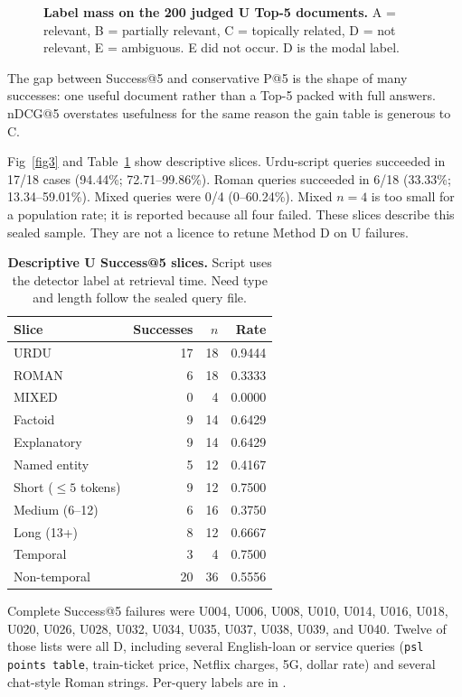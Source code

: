 \documentclass[10pt,letterpaper]{article}
\begin{document}
\begin{figure}[!h]
\caption{\textbf{Label mass on the 200 judged U Top-5 documents.} A = relevant, B = partially relevant, C = topically related, D = not relevant, E = ambiguous. E did not occur. D is the modal label.}
\label{fig5}
\end{figure}

The gap between Success@5 and conservative P@5 is the shape of many successes: one useful document rather than a Top-5 packed with full answers. nDCG@5 overstates usefulness for the same reason the gain table is generous to C.

Fig~\ref{fig3} and Table~\ref{table6} show descriptive slices. Urdu-script queries succeeded in 17/18 cases (94.44\%; 72.71--99.86\%). Roman queries succeeded in 6/18 (33.33\%; 13.34--59.01\%). Mixed queries were 0/4 (0--60.24\%). Mixed $n = 4$ is too small for a population rate; it is reported because all four failed. These slices describe this sealed sample. They are not a licence to retune Method D on U failures.

\begin{table}[!ht]
\centering
\caption{\textbf{Descriptive U Success@5 slices.} Script uses the detector label at retrieval time. Need type and length follow the sealed query file.}
\begin{tabular}{|l|r|r|r|}
\hline
\textbf{Slice} & \textbf{Successes} & \textbf{$n$} & \textbf{Rate} \\
\hline
URDU & 17 & 18 & 0.9444 \\
\hline
ROMAN & 6 & 18 & 0.3333 \\
\hline
MIXED & 0 & 4 & 0.0000 \\
\hline
Factoid & 9 & 14 & 0.6429 \\
\hline
Explanatory & 9 & 14 & 0.6429 \\
\hline
Named entity & 5 & 12 & 0.4167 \\
\hline
Short ($\leq 5$ tokens) & 9 & 12 & 0.7500 \\
\hline
Medium (6--12) & 6 & 16 & 0.3750 \\
\hline
Long (13+) & 8 & 12 & 0.6667 \\
\hline
Temporal & 3 & 4 & 0.7500 \\
\hline
Non-temporal & 20 & 36 & 0.5556 \\
\hline
\end{tabular}
\label{table6}
\end{table}

Complete Success@5 failures were U004, U006, U008, U010, U014, U016, U018, U020, U026, U028, U032, U034, U035, U037, U038, U039, and U040. Twelve of those lists were all D, including several English-loan or service queries (\texttt{psl points table}, train-ticket price, Netflix charges, 5G, dollar rate) and several chat-style Roman strings. Per-query labels are in .
\end{document}
